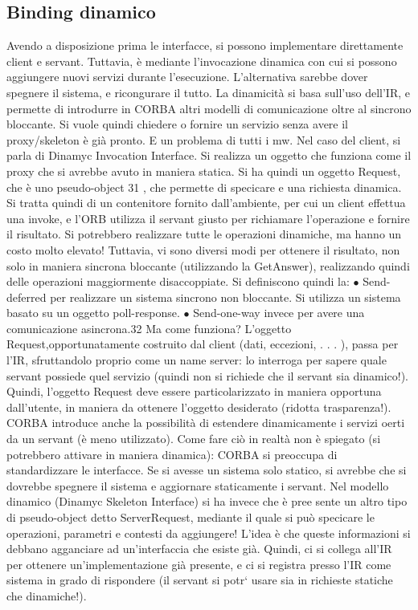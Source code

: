 \subsection{Binding dinamico}
Avendo a disposizione prima le interfacce, si possono implementare direttamente client e servant. Tuttavia, è mediante
l'invocazione dinamica con cui
si possono aggiungere nuovi servizi durante l'esecuzione. L'alternativa sarebbe
dover spegnere il sistema, e ricongurare il tutto. La dinamicità si basa sull'uso
dell'IR, e permette di introdurre in CORBA altri modelli di comunicazione oltre
al sincrono bloccante.
Si vuole quindi chiedere o fornire un servizio senza avere il proxy/skeleton è già pronto. E un problema di tutti i mw.
Nel caso del client, si parla di Dinamyc Invocation Interface. Si realizza un oggetto che funziona come il proxy che si
avrebbe avuto in maniera statica. Si ha quindi un oggetto Request, che è uno pseudo-object 31 , che permette di
specicare e una richiesta dinamica. Si tratta quindi di un contenitore fornito dall'ambiente,
per cui un client effettua una invoke, e l'ORB utilizza il servant giusto per
richiamare l'operazione e fornire il risultato. Si potrebbero realizzare tutte le
operazioni dinamiche, ma hanno un costo molto elevato! Tuttavia, vi sono
diversi modi per ottenere il risultato, non solo in maniera sincrona bloccante
(utilizzando la GetAnswer), realizzando quindi delle operazioni maggiormente
disaccoppiate. Si definiscono quindi la:
$\bullet$ Send-deferred per realizzare un sistema sincrono non bloccante. Si utilizza
un sistema basato su un oggetto poll-response.
$\bullet$ Send-one-way invece per avere una comunicazione asincrona.32
Ma come funziona? L'oggetto Request,opportunatamente costruito dal client
(dati, eccezioni, . . . ), passa per l'IR, sfruttandolo proprio come un name server: lo interroga per sapere quale
servant possiede quel servizio (quindi non si
richiede che il servant sia dinamico!). Quindi, l'oggetto Request deve essere particolarizzato in maniera opportuna
dall'utente, in maniera da ottenere l'oggetto
desiderato (ridotta trasparenza!).
CORBA introduce anche la possibilità di estendere dinamicamente i servizi
oerti da un servant (è meno utilizzato). Come fare ciò in realtà non è spiegato
(si potrebbero attivare in maniera dinamica): CORBA si preoccupa di standardizzare le interfacce. Se si avesse un
sistema solo statico, si avrebbe che si
dovrebbe spegnere il sistema e aggiornare staticamente i servant.
Nel modello dinamico (Dinamyc Skeleton Interface) si ha invece che è pree
sente un altro tipo di pseudo-object detto ServerRequest, mediante il quale si può
specicare le operazioni, parametri e contesti da aggiungere! L'idea è che queste
informazioni si debbano agganciare ad un'interfaccia che esiste già. Quindi, ci
si collega all'IR per ottenere un'implementazione già presente, e ci si registra
presso l'IR come sistema in grado di rispondere (il servant si potr` usare sia in
richieste statiche che dinamiche!).
